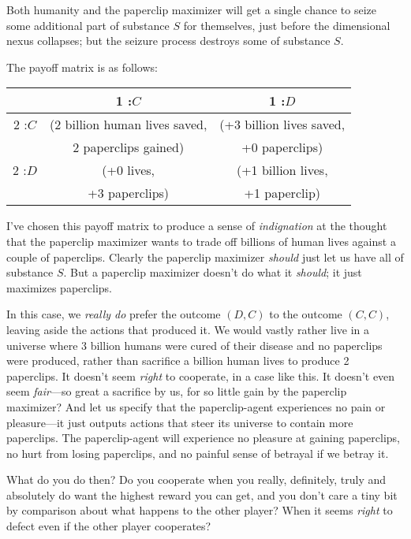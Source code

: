{
 Both humanity and the paperclip maximizer will get a single chance
to seize some additional part of substance $S$ for themselves, just
before the dimensional nexus collapses; but the seizure process
destroys some of substance $S$.}

{
 The payoff matrix is as follows:}

\begin{center}
  \begin{tabular}{|c|c|c|}
    \hline
    &  1 :$C$ & 1 :$D$ \\
    \hline
    2 :$C$ & (2 billion human lives saved, & (+3 billion lives saved,\\
    &  2 paperclips gained)  &  +0 paperclips)  \\
    \hline
    2 :$D$ & (+0 lives,  & (+1 billion lives, \\
    &  +3 paperclips) &  +1 paperclip) \\
    \hline
  \end{tabular}
\end{center}

{
 I've chosen this
payoff matrix to produce a sense of \textit{indignation} at the thought
that the paperclip maximizer wants to trade off billions of human lives
against a couple of paperclips. Clearly the paperclip maximizer
\textit{should} just let us have all of substance $S$. But a paperclip
maximizer doesn't do what it \textit{should}; it just
maximizes paperclips.}

{
 In this case, we \textit{really do} prefer the outcome $(D,C)$ to
the outcome $(C,C)$, leaving aside the actions that produced it. We would
vastly rather live in a universe where 3 billion humans were cured of
their disease and no paperclips were produced, rather than sacrifice a
billion human lives to produce 2 paperclips. It doesn't
seem \textit{right} to cooperate, in a case like this. It
doesn't even seem \textit{fair}{}---so great a
sacrifice by us, for so little gain by the paperclip maximizer? And let
us specify that the paperclip-agent experiences no pain or
pleasure---it just outputs actions that steer its universe to contain
more paperclips. The paperclip-agent will experience no pleasure at
gaining paperclips, no hurt from losing paperclips, and no painful
sense of betrayal if we betray it.}

{
 What do you do then? Do you cooperate when you really, definitely,
truly and absolutely do want the highest reward you can get, and you
don't care a tiny bit by comparison about what happens
to the other player? When it seems \textit{right} to defect even if the
other player cooperates?}


